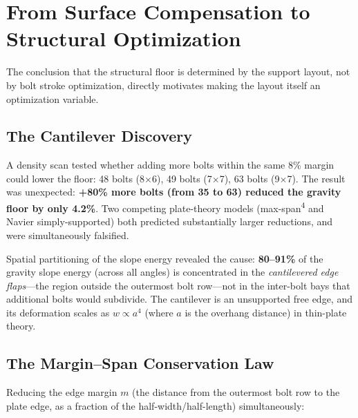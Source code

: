 \documentclass{CVM}
\begin{document}
\section{From Surface Compensation to Structural Optimization}
\label{sec:structural}

The conclusion that the structural floor is determined by the support layout,
not by bolt stroke optimization, directly motivates making the layout itself an
optimization variable.

\subsection{The Cantilever Discovery}

A density scan tested whether adding more bolts within the same 8\% margin
could lower the floor: 48 bolts (8$\times$6), 49 bolts (7$\times$7), 63 bolts
(9$\times$7). The result was unexpected: \textbf{+80\% more bolts (from 35 to
63) reduced the gravity floor by only 4.2\%}. Two competing plate-theory models
(max-span\textsuperscript{4} and Navier simply-supported) both predicted
substantially larger reductions, and were simultaneously falsified.

Spatial partitioning of the slope energy revealed the cause: \textbf{80--91\%}
of the gravity slope energy (across all angles) is concentrated in the
\emph{cantilevered edge flaps}---the region outside the outermost bolt row---not
in the inter-bolt bays that additional bolts would subdivide. The cantilever
is an unsupported free edge, and its deformation scales as $w \propto a^4$
(where $a$ is the overhang distance) in thin-plate theory.

\subsection{The Margin--Span Conservation Law}

Reducing the edge margin $m$ (the distance from the outermost bolt row to the
plate edge, as a fraction of the half-width/half-length) simultaneously:
\end{document}
